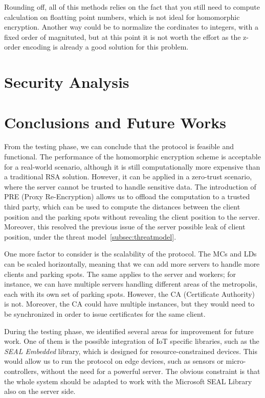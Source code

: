 Rounding off, all of this methods relies on the fact that you still need to compute calculation on floatting point numbers, which is not ideal for homomorphic encryption. Another way could be to normalize the cordinates to integers, with a fixed order of magnituted, but at this point it is not worth the effort as the z-order encoding is already a good solution for this problem.


\section{Security Analysis}



\section{Conclusions and Future Works}

From the testing phase, we can conclude that the protocol is feasible and functional. The performance of the homomorphic encryption scheme is acceptable for a real-world scenario, although it is still computationally more expensive than a traditional RSA solution. However, it can be applied in a zero-trust scenario, where the server cannot be trusted to handle sensitive data. The introduction of PRE (Proxy Re-Encryption) allows us to offload the computation to a trusted third party, which can be used to compute the distances between the client position and the parking spots without revealing the client position to the server. Moreover, this resolved the previous issue of the server possible leak of client position, under the threat model~\cref{subsec:threatmodel}.

One more factor to consider is the scalability of the protocol. The MCs and LDs can be scaled horizontally, meaning that we can add more servers to handle more clients and parking spots. The same applies to the server and workers; for instance, we can have multiple servers handling different areas of the metropolis, each with its own set of parking spots. However, the CA (Certificate Authority) is not. Moreover, the CA could have multiple instances, but they would need to be synchronized in order to issue certificates for the same client.

During the testing phase, we identified several areas for improvement for future work. One of them is the possible integration of IoT specific libraries, such as the \emph{SEAL Embedded} \cite{sealembedded} library, which is designed for resource-constrained devices. This would allow us to run the protocol on edge devices, such as sensors or micro-controllers, without the need for a powerful server. The obvious constraint is that the whole system should be adapted to work with the Microsoft SEAL\cite{sealcrypto} Library also on the server side. 

